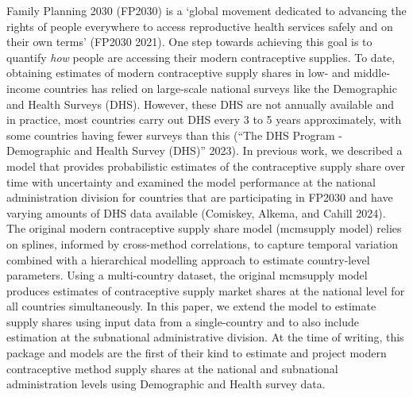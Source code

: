Family Planning 2030 (FP2030) is a `global movement dedicated to advancing the rights of people everywhere to access reproductive health services safely and on their own terms' (FP2030 2021). One step towards achieving this goal is to quantify \textit{how} people are accessing their modern contraceptive supplies. To date, obtaining estimates of modern contraceptive supply shares in low- and middle-income countries has relied on large-scale national surveys like the Demographic and Health Surveys (DHS). However, these DHS are not annually available and in practice, most countries carry out DHS every 3 to 5 years approximately, with some countries having fewer surveys than this ({``{The DHS Program - Demographic and Health Survey (DHS)}''} 2023). In previous work, we described a model that provides probabilistic estimates of the contraceptive supply share over time with uncertainty and examined the model performance at the national administration division for countries that are participating in FP2030 and have varying amounts of DHS data available (Comiskey, Alkema, and Cahill 2024). The original modern contraceptive supply share model (mcmsupply model) relies on splines, informed by cross-method correlations, to capture temporal variation combined with a hierarchical modelling approach to estimate country-level parameters. Using a multi-country dataset, the original mcmsupply model produces estimates of contraceptive supply market shares at the national level for all countries simultaneously. In this paper, we extend the model to estimate supply shares using input data from a single-country and to also include estimation at the subnational administrative division. At the time of writing, this package and models are the first of their kind to estimate and project modern contraceptive method supply shares at the national and subnational administration levels using Demographic and Health survey data.


